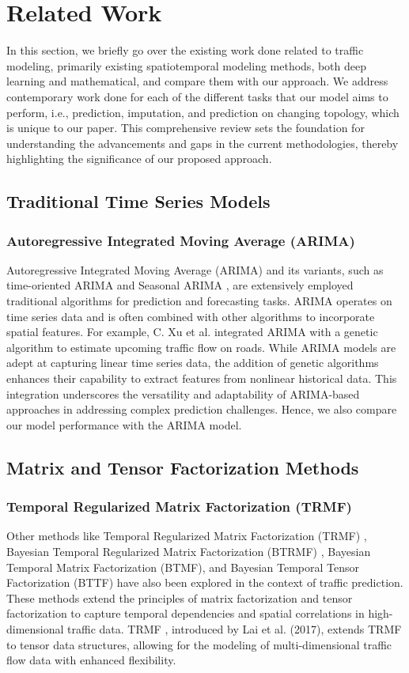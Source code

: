 \chapter{Related Work}\label{chap1}

In this section, we briefly go over the existing work done related to traffic modeling, primarily existing spatiotemporal modeling methods, both deep learning and mathematical, and compare them with our approach. We address contemporary work done for each of the different tasks that our model aims to perform, i.e., prediction, imputation, and prediction on changing topology, which is unique to our paper. This comprehensive review sets the foundation for understanding the advancements and gaps in the current methodologies, thereby highlighting the significance of our proposed approach.

\section{Traditional Time Series Models}
\subsection{Autoregressive Integrated Moving Average (ARIMA)}
Autoregressive Integrated Moving Average (ARIMA) \cite{arima} and its variants, such as time-oriented ARIMA \cite{time_arima} and Seasonal ARIMA \cite{sarima}, are extensively employed traditional algorithms for prediction and forecasting tasks. ARIMA operates on time series data and is often combined with other algorithms to incorporate spatial features. For example, C. Xu et al. integrated ARIMA with a genetic algorithm to estimate upcoming traffic flow on roads. While ARIMA models are adept at capturing linear time series data, the addition of genetic algorithms enhances their capability to extract features from nonlinear historical data. This integration underscores the versatility and adaptability of ARIMA-based approaches in addressing complex prediction challenges. Hence, we also compare our model performance with the ARIMA model.

\section{Matrix and Tensor Factorization Methods}
\subsection{Temporal Regularized Matrix Factorization (TRMF)}
Other methods like Temporal Regularized Matrix Factorization (TRMF) \cite{trmf}, Bayesian Temporal Regularized Matrix Factorization (BTRMF) \cite{btrmf}, Bayesian Temporal Matrix Factorization (BTMF), and Bayesian Temporal Tensor Factorization (BTTF) have also been explored in the context of traffic prediction. These methods extend the principles of matrix factorization and tensor factorization to capture temporal dependencies and spatial correlations in high-dimensional traffic data. TRMF \cite{trmf}, introduced by Lai et al. (2017), extends TRMF to tensor data structures, allowing for the modeling of multi-dimensional traffic flow data with enhanced flexibility.

